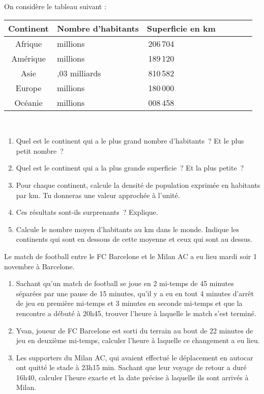 \begin{exercice}
On considère le tableau suivant :

\begin{center}
\begin{tabularx}{\linewidth}{|c|*{6}{>{\centering \arraybackslash}X|}}
\hline \rowcolor{U1} Continent & Nombre d'habitants & Superficie en km\up{2} \\
\hline \rowcolor{A3} Afrique & 965 millions & 30\,206\,704 \\
\hline \rowcolor{A3} Amérique & 911 millions & 42\,189\,120 \\
\hline \rowcolor{A3} Asie & 4,03 milliards & 43\,810\,582 \\
\hline \rowcolor{A3} Europe & 731 millions & 10\,180\,000 \\
\hline \rowcolor{A3} Océanie & 34 millions & 9\,008\,458 \\
\hline
\end{tabularx} \\
\end{center}

\begin{enumerate}
 \item Quel est le continent qui a le plus grand nombre d'habitants ? Et le plus petit nombre ?
 \item Quel est le continent qui a la plus grande superficie ? Et la plus petite ?
 \item Pour chaque continent, calcule la densité de population exprimée en habitants par km. Tu donneras une valeur approchée à l'unité. 
 \item Ces résultats sont‑ils surprenants ? Explique.
 \item Calcule le nombre moyen d'habitants au km dans le monde. Indique les continents qui sont en dessous de cette moyenne et ceux qui sont au dessus. 
 \end{enumerate}
\end{exercice}


\begin{exercice}[Football]
Le match de football entre le FC Barcelone et le Milan AC a eu lieu mardi soir 1 novembre à Barcelone. 
\begin{enumerate}
 \item Sachant qu’un match de football se joue en 2 mi-temps de 45 minutes séparées par une pause de 15 minutes, qu’il y a eu en tout 4 minutes d’arrêt de jeu en première mi-temps et 3 minutes en seconde mi-temps et que la rencontre a débuté à 20h45, trouver l’heure à laquelle le match s’est terminé. 
 \item Yvan, joueur de FC Barcelone est sorti du terrain au bout de 22 minutes de jeu en deuxième mi-temps, calculer l’heure à laquelle ce changement a eu lieu.
 \item Les supporters du Milan AC, qui avaient effectué le déplacement en autocar ont quitté le stade à 23h15 min. Sachant que leur voyage de retour a duré 16h40, calculer l’heure exacte et la date précise à laquelle ils sont arrivés à Milan. 
 \end{enumerate}
\end{exercice}